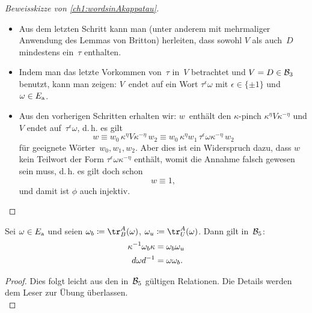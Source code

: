 \begin{proof}[Beweisskizze von \cref{ch1:wordsinAkappatau}]
\begin{itemize}
        \item
            Aus dem letzten Schritt kann man (unter anderem mit mehrmaliger
            Anwendung des Lemmas von Britton) herleiten, dass sowohl
            $V$ als auch~$D$ mindestens ein~$\tau$ enthalten.
            
        \item
            Indem man das letzte Vorkommen von~$\tau$ in~$V$ betrachtet
            und $V=D\in\mathcal{B}_3$ benutzt, kann man zeigen: $V$~endet auf
            ein Wort $\tau^\epsilon\omega$ mit $\epsilon\in\{\pm1\}$ und
            $\omega\in E_{\mathrm a}$.
            
        \item
            Aus den vorherigen Schritten erhalten wir:
            $w$~enthält den $\kappa$-pinch $\kappa^\eta V\!\kappa^{-\eta}$
            und $V$ endet auf~$\tau^\epsilon\omega$, d.\,h. es gilt
            \[ w \equiv w_0 \, \kappa^\eta V\!\kappa^{-\eta} \, w_2
                 \equiv w_0 \, \kappa^\eta w_1 \,
                 \tau^\epsilon\omega\kappa^{-\eta} \, w_2
            \]
            für geeignete Wörter~$w_0,w_1,w_2$.
            Aber dies ist ein Widerspruch dazu, dass $w$ kein Teilwort
            der Form $\tau^\epsilon\omega\kappa^{-\eta}$ enthält, womit
            die Annahme falsch gewesen sein muss, d.\,h. es gilt doch schon
            \[ w\equiv 1  , \]
            und damit ist $\phi$ auch injektiv.
            \\
            \qedhere
    \end{itemize}
\end{proof}

\begin{thLemma}\label{ch1:conjugatesinBT5}
    Sei $\omega\in E_{\mathrm a}$ und seien $\omega_b \defeq \tr^A_B(\omega)$,
    $\omega_u \defeq \tr^A_U(\omega)$. Dann gilt in~$\mathcal{B}_5$:
    \begin{align*}
        \kappa^{-1} \omega_b \kappa &= \omega_b\omega_u  \\
        d \omega d^{-1} &= \omega\omega_b
    . \end{align*}
\end{thLemma}
%
\begin{proof}
    Dies folgt leicht aus den in~$\mathcal{B}_5$ gültigen Relationen.
    Die Details werden dem Leser zur Übung überlassen.
    \\
\end{proof}

